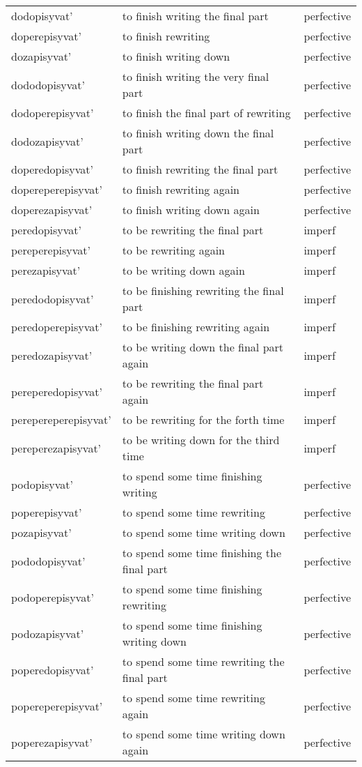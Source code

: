 \begin{longtable}{lll}
dodopisyvat' & to finish writing the final part & perfective \\ 
doperepisyvat' & to finish rewriting & perfective \\ 
dozapisyvat' & to finish writing down & perfective \\ 
dododopisyvat' & to finish writing the very final part & perfective \\ 
dodoperepisyvat' & to finish the final part of rewriting   & perfective \\ 
dodozapisyvat' & to finish writing down the final part  & perfective \\ 
doperedopisyvat' & to finish rewriting the final part  & perfective \\ 
dopereperepisyvat' & to finish rewriting again & perfective \\ 
doperezapisyvat' & to finish writing down again & perfective \\  \midrule

peredopisyvat' & to be rewriting the final part & imperf \\ 
pereperepisyvat' & to be rewriting again & imperf\\ 
perezapisyvat' & to be writing down again & imperf\\ 
peredodopisyvat' & to be finishing rewriting the final part & imperf\\ 
peredoperepisyvat' & to be finishing rewriting  again & imperf\\ 
peredozapisyvat' & to be writing down the final part again & imperf \\ 
pereperedopisyvat' & to be rewriting the final part again & imperf \\ 
perepereperepisyvat' & to be rewriting for the forth time & imperf \\ 
pereperezapisyvat' & to be writing down for the third time & imperf \\  \midrule

podopisyvat' & to spend some time finishing writing & perfective \\ 
poperepisyvat' & to spend some time rewriting & perfective \\ 
pozapisyvat' & to spend some time writing down & perfective \\ 
pododopisyvat' & to spend some time finishing the final part & perfective \\ 
podoperepisyvat' & to spend some time finishing rewriting & perfective \\ 
podozapisyvat' & to spend some time finishing writing down & perfective \\ 
poperedopisyvat' & to spend some time rewriting the final part & perfective \\ 
popereperepisyvat' & to spend some time rewriting again & perfective \\ 
poperezapisyvat' & to spend some time writing down again & perfective \\  
\end{longtable}

